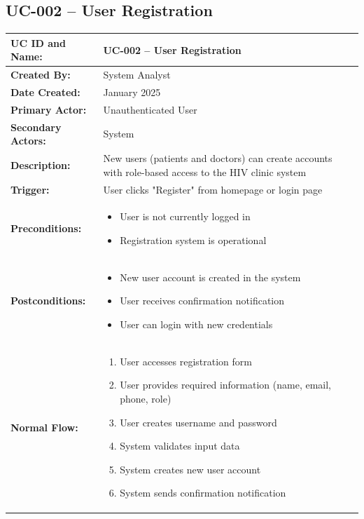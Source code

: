 \documentclass[12pt,a4paper]{article}
\begin{document}
\subsection{UC-002 – User Registration}

\renewcommand{\arraystretch}{1.5}
\begin{longtable}{|p{4.5cm}|p{10.5cm}|}
\hline
\textbf{UC ID and Name:} & UC-002 – User Registration \\
\hline
\textbf{Created By:} & System Analyst \\
\hline
\textbf{Date Created:} & January 2025 \\
\hline
\textbf{Primary Actor:} & Unauthenticated User \\
\hline
\textbf{Secondary Actors:} & System \\
\hline
\textbf{Description:} & New users (patients and doctors) can create accounts with role-based access to the HIV clinic system \\
\hline
\textbf{Trigger:} & User clicks "Register" from homepage or login page \\
\hline
\textbf{Preconditions:} &
\begin{itemize}
  \item User is not currently logged in
  \item Registration system is operational
\end{itemize} \\
\hline
\textbf{Postconditions:} &
\begin{itemize}
  \item New user account is created in the system
  \item User receives confirmation notification
  \item User can login with new credentials
\end{itemize} \\
\hline
\textbf{Normal Flow:} &
\begin{enumerate}
  \item User accesses registration form
  \item User provides required information (name, email, phone, role)
  \item User creates username and password
  \item System validates input data
  \item System creates new user account
  \item System sends confirmation notification
\end{enumerate} \\

\end{longtable}
\end{document}
